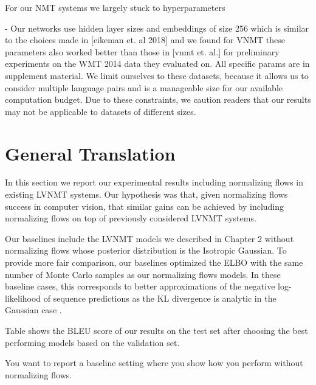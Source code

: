 For our \ac{NMT} systems we largely stuck to hyperparameters 

- Our networks use hidden layer sizes and embeddings of size 256 which is similar to the choices made in [eikeman et. al 2018] and we found for VNMT these parameters also worked better than those in [vnmt et. al.] for preliminary experiments on the WMT 2014 data they evaluated on. All specific params are in supplement material.
We limit ourselves to these datasets, because it allows us to consider multiple language pairs and is a manageable size for our available computation budget. Due to these constraints, we caution readers that our results may not be applicable to datasets of different sizes.

\section{General Translation}

In this section we report our experimental results including normalizing flows in existing \ac{LVNMT} systems. Our hypothesis was that, given normalizing flows success in computer vision, that similar gains can be achieved by including normalizing flows on top of previously considered \ac{LVNMT} systems.  

Our baselines include the \ac{LVNMT} models we described in Chapter 2 without normalizing flows whose posterior distribution is the Isotropic Gaussian. To provide more fair comparison, our baselines optimized the \ac{ELBO} with the same number of Monte Carlo samples as our normalizing flows models. In these baseline cases, this corresponds to better approximations of the negative log-likelihood of sequence predictions as the KL divergence is analytic in the Gaussian case \cite{kingma2014autoencodingVB,rezende2014stochasticBackprop}.

 Table \reminder{\#} shows the BLEU score of our results on the test set after choosing the best performing models based on the validation set. 



You want to report a baseline setting where you show how you perform without normalizing flows.


